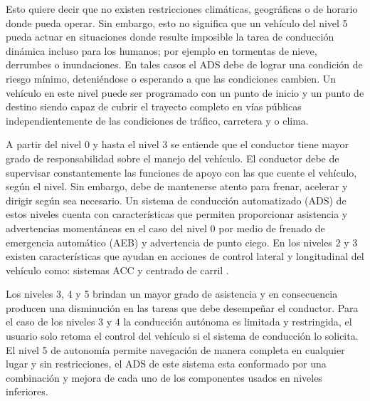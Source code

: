 \begin{itemize}
    Esto quiere decir que no existen restricciones climáticas, geográficas o de horario donde pueda operar. Sin embargo, esto no significa que un vehículo del nivel 5 pueda actuar en situaciones donde resulte imposible la tarea de conducción dinámica incluso para los humanos; por ejemplo en tormentas de nieve, derrumbes o inundaciones. En tales casos el ADS debe de lograr una condición de riesgo mínimo, deteniéndose o esperando a que las condiciones cambien. Un vehículo en este nivel puede ser programado con un punto de inicio y un punto de destino siendo capaz de cubrir el trayecto completo en vías públicas independientemente de las condiciones de tráfico, carretera y o clima.
\end{itemize}



A partir del nivel 0 y hasta el nivel 3 se entiende que el conductor tiene mayor grado de responsabilidad sobre el manejo del vehículo. El conductor debe de supervisar constantemente las funciones de apoyo con las que cuente el vehículo, según el nivel. Sin embargo, debe de mantenerse atento para frenar, acelerar y dirigir según sea necesario. Un sistema de conducción automatizado (ADS) de estos niveles cuenta con características que permiten proporcionar asistencia y advertencias momentáneas en el caso del nivel 0 por medio de frenado de emergencia automático (AEB)  y advertencia de punto ciego. En los niveles 2 y 3 existen características que ayudan en acciones de control lateral y longitudinal del vehículo como: sistemas ACC y centrado de carril \cite{sae2021surface}.

Los niveles 3, 4 y 5 brindan un mayor grado de asistencia y en consecuencia producen una disminución en las tareas que debe desempeñar el conductor. Para el caso de los niveles 3 y 4 la conducción autónoma es limitada y restringida, el usuario solo retoma el control del vehículo si el sistema de conducción lo solicita. El nivel 5 de autonomía permite navegación de manera completa en cualquier lugar y sin restricciones, el ADS de este sistema esta conformado por una combinación y mejora de cada uno de los componentes usados en niveles inferiores\cite{sae2021surface}.



